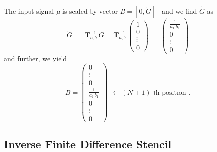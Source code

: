 The input signal $\mu$ is scaled by vector $B = [0, \tilde{G}]^\top$ and we find $\tilde{G}$ as 
\begin{equation}
	\tilde{G} ~=~ \mathbf{T}_{a,b}^{-1} ~ G = \mathbf{T}_{a,b}^{-1} ~ 
	\begin{pmatrix}
		1 \\
		0 \\
		\vdots \\
		0
	\end{pmatrix} ~=~
	\begin{pmatrix}
		\frac{1}{a_{1} ~ b_{1}} \\
		0 \\
		\vdots \\
		0
	\end{pmatrix}
\end{equation}
and further, we yield
\begin{equation*}
	B = 
	\begin{pmatrix}
		0 \\
		\vdots \\
		0 \\
		\frac{1}{a_{1} ~ b_{1}} \\
		0 \\
		\vdots \\
		0
	\end{pmatrix}
	\begin{matrix}
		\\
		\\
		\\
		\leftarrow (N+1)\text{-th position}\\
		\\
		\\
		~
	\end{matrix}
	\textbf{.}
\end{equation*}

\subsection*{Inverse Finite Difference Stencil}

